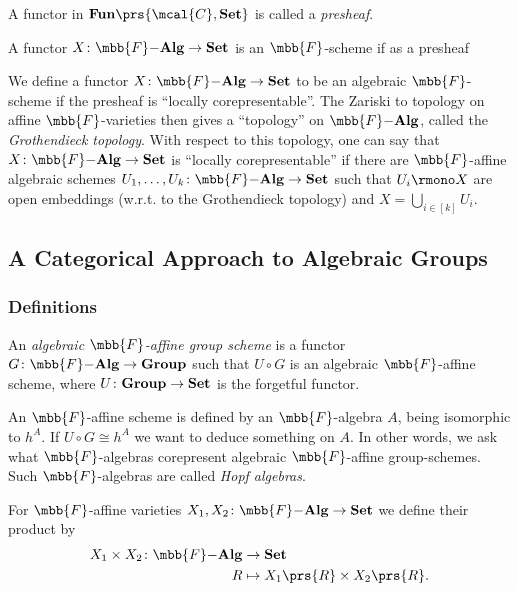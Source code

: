 \documentclass[10pt,a4paper,twoside,openany,hidelinks]{book}
\begin{document}
\begin{definition}[Presheaf]
A functor in $\mbf{Fun}\prs{\mcal{C},\mbf{Set}}$ is called a \emph{presheaf}.
\end{definition}

\begin{definition}
A functor $X \colon \mbb{F}\mbf{-Alg} \to \mbf{Set}$ is an $\mbb{F}$-scheme if as a presheaf 
\end{definition}

We define a functor $X \colon \mbb{F}\mbf{-Alg} \to \mbf{Set}$ to be an algebraic $\mbb{F}$-scheme if the presheaf is ``locally corepresentable''. The Zariski to topology on affine $\mbb{F}$-varieties then gives a ``topology'' on $\mbb{F}\mbf{-Alg}$, called the \emph{Grothendieck topology}.
With respect to this topology, one can say that $X \colon \mbb{F}\mbf{-Alg} \to \mbf{Set}$ is ``locally corepresentable'' if there are $\mbb{F}$-affine algebraic schemes $U_1, \ldots, U_k \colon \mbb{F}\mbf{-Alg} \to \mbf{Set}$ such that $U_i \rmono X$ are open embeddings (w.r.t. to the Grothendieck topology) and $X = \bigcup_{i \in [k]} U_i$.

\subsection{A Categorical Approach to Algebraic Groups}

\subsubsection{Definitions}

\begin{definition}
An \emph{algebraic $\mbb{F}$-affine group scheme} is a functor $G \colon \mbb{F}\mbf{-Alg} \to \mbf{Group}$ such that $U \circ G$ is an algebraic $\mbb{F}$-affine scheme, where $U \colon \mathbf{Group} \to \mathbf{Set}$ is the forgetful functor.
\end{definition}

\begin{remark}
An $\mbb{F}$-affine scheme is defined by an $\mbb{F}$-algebra $A$, being isomorphic to $h^A$. If $U \circ G \cong h^A$ we want to deduce something on $A$. In other words, we ask what $\mbb{F}$-algebras corepresent algebraic $\mbb{F}$-affine group-schemes. Such $\mbb{F}$-algebras are called \emph{Hopf algebras}.
\end{remark}

\begin{definition}
For $\mbb{F}$-affine varieties $X_1, X_2 \colon \mbb{F}\mbf{-Alg} \to \mbf{Set}$ we define their product by
\begin{align*}
X_1 \times X_2 \colon \mbb{F}\mbf{-Alg} &\to \mbf{Set} \\
R &\mapsto X_1\prs{R} \times X_2\prs{R} \text{.}
\end{align*}
\end{definition}
\end{document}
